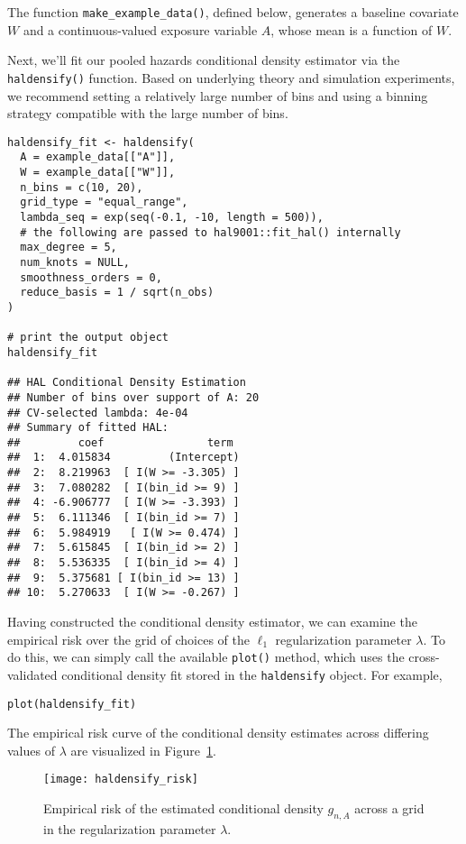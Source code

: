 The function \texttt{make\_example\_data()}, defined below, generates a baseline
covariate $W$ and a continuous-valued exposure variable $A$, whose mean is a
function of $W$.

Next, we'll fit our pooled hazards conditional density estimator via the
\texttt{haldensify()} function. Based on underlying theory and simulation
experiments, we recommend setting a relatively large number of bins and using a
binning strategy compatible with the large number of bins.

\begin{lstlisting}
haldensify_fit <- haldensify(
  A = example_data[["A"]],
  W = example_data[["W"]],
  n_bins = c(10, 20),
  grid_type = "equal_range",
  lambda_seq = exp(seq(-0.1, -10, length = 500)),
  # the following are passed to hal9001::fit_hal() internally
  max_degree = 5,
  num_knots = NULL,
  smoothness_orders = 0,
  reduce_basis = 1 / sqrt(n_obs)
)

# print the output object
haldensify_fit

## HAL Conditional Density Estimation
## Number of bins over support of A: 20
## CV-selected lambda: 4e-04
## Summary of fitted HAL:
##         coef                term
##  1:  4.015834         (Intercept)
##  2:  8.219963  [ I(W >= -3.305) ]
##  3:  7.080282  [ I(bin_id >= 9) ]
##  4: -6.906777  [ I(W >= -3.393) ]
##  5:  6.111346  [ I(bin_id >= 7) ]
##  6:  5.984919   [ I(W >= 0.474) ]
##  7:  5.615845  [ I(bin_id >= 2) ]
##  8:  5.536335  [ I(bin_id >= 4) ]
##  9:  5.375681 [ I(bin_id >= 13) ]
## 10:  5.270633  [ I(W >= -0.267) ]
\end{lstlisting}

Having constructed the conditional density estimator, we can examine the
empirical risk over the grid of choices of the $\ell_1$ regularization parameter
$\lambda$. To do this, we can simply call the available \texttt{plot()} method,
which uses the cross-validated conditional density fit stored in the
\texttt{haldensify} object. For example,

\begin{lstlisting}
plot(haldensify_fit)
\end{lstlisting}

The empirical risk curve of the conditional density estimates across differing
values of $\lambda$ are visualized in Figure~\ref{fig:haldensify_risk}.
\begin{figure}[H]
  \centering
  \texttt{[image: haldensify\_risk]}
  \caption{Empirical risk of the estimated conditional density $g_{n,A}$ across
      a grid in the regularization parameter $\lambda$.}
  \label{fig:haldensify_risk}
\end{figure}

